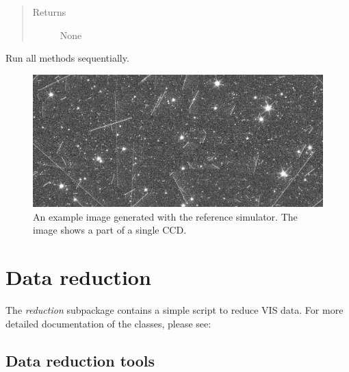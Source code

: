 \documentclass[a4paper,12pt,english]{sphinxmanual}
\begin{document}
\begin{fulllineitems}
\begin{fulllineitems}
\begin{quote}
\begin{description}
\item[{Returns}] \leavevmode
None

\end{description}\end{quote}

\end{fulllineitems}


\begin{fulllineitems}
\label{simulator:simulator.generateGalaxies.generateFakeData.runAll}
Run all methods sequentially.

\end{fulllineitems}


\end{fulllineitems}

\begin{figure}[htbp]
\centering
\capstart

\includegraphics{simu.pdf}
\caption{An example image generated with the reference simulator. The image shows a part of a single
CCD.}\end{figure}


\chapter{Data reduction}
\label{index:data-reduction}
The \emph{reduction} subpackage contains a simple script to reduce VIS data. For more detailed documentation
of the classes, please see:


\section{Data reduction tools}
\label{reduction:module-reduction.reduceVISdata}\label{reduction::doc}\label{reduction:data-reduction-tools}
\end{document}
